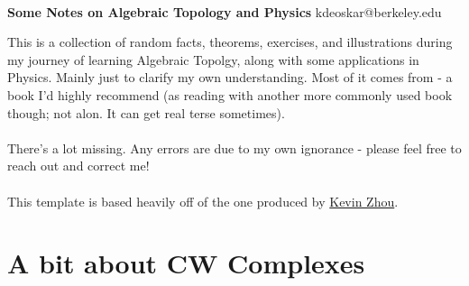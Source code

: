 \documentclass[11pt]{article}
\begin{document}
\thispagestyle{empty}
\bigskip \
\vspace{0.1cm}

\begin{center}
{\fontsize{30}{30} \selectfont \bf \sffamily Some Notes on Algebraic Topology and Physics}
\vskip 6pt
{\fontsize{14}{14} \selectfont \ttfamily kdeoskar@berkeley.edu} 
\vskip 24pt
\end{center}



This is a collection of random facts, theorems, exercises, and illustrations during my journey of learning Algebraic Topolgy, along with some applications in Physics. Mainly just to clarify my own understanding. Most of it comes from \cite{FomenkoFuchs16} - a book I'd highly recommend (as reading with another more commonly used book though; not alon. It can get real terse sometimes).
\\
\\
There's a lot missing. Any errors are due to my own ignorance - please feel free to reach out and correct me!
\\
\\
This template is based heavily off of the one produced by \href{https://knzhou.github.io/}{Kevin Zhou}.

\setcounter{tocdepth}{3}
\tableofcontents 



\newpage
\section{A bit about CW Complexes}







\newpage
\end{document}
